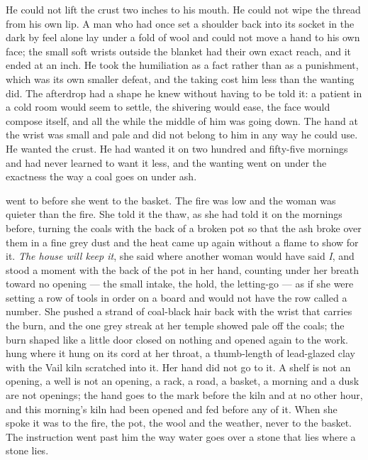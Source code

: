 He could not lift the crust two inches to his mouth. He could not wipe the thread from his own lip. A man who had once set a shoulder back into its socket in the dark by feel alone lay under a fold of wool and could not move a hand to his own face; the small soft wrists outside the blanket had their own exact reach, and it ended at an inch. He took the humiliation as a fact rather than as a punishment, which was its own smaller defeat, and the taking cost him less than the wanting did. The afterdrop had a shape he knew without having to be told it: a patient in a cold room would seem to settle, the shivering would ease, the face would compose itself, and all the while the middle of him was going down. The hand at the wrist was small and pale and did not belong to him in any way he could use. He wanted the crust. He had wanted it on two hundred and fifty-five mornings and had never learned to want it less, and the wanting went on under the exactness the way a coal goes on under ash.

\scenebreak

 went to  before she went to the basket. The fire was low and the woman was quieter than the fire. She told it the thaw, as she had told it on the mornings before, turning the coals with the back of a broken pot so that the ash broke over them in a fine grey dust and the heat came up again without a flame to show for it. \emph{The house will keep it}, she said where another woman would have said \emph{I}, and stood a moment with the back of the pot in her hand, counting under her breath toward no opening --- the small intake, the hold, the letting-go --- as if she were setting a row of tools in order on a board and would not have the row called a number. She pushed a strand of coal-black hair back with the wrist that carries the burn, and the one grey streak at her temple showed pale off the coals; the burn shaped like a little door closed on nothing and opened again to the work.  hung where it hung on its cord at her throat, a thumb-length of lead-glazed clay with the Vail kiln scratched into it. Her hand did not go to it. A shelf is not an opening, a well is not an opening, a rack, a road, a basket, a morning and a dusk are not openings; the hand goes to the mark before the kiln and at no other hour, and this morning's kiln had been opened and fed before any of it. When she spoke it was to the fire, the pot, the wool and the weather, never to the basket. The instruction went past him the way water goes over a stone that lies where a stone lies.

